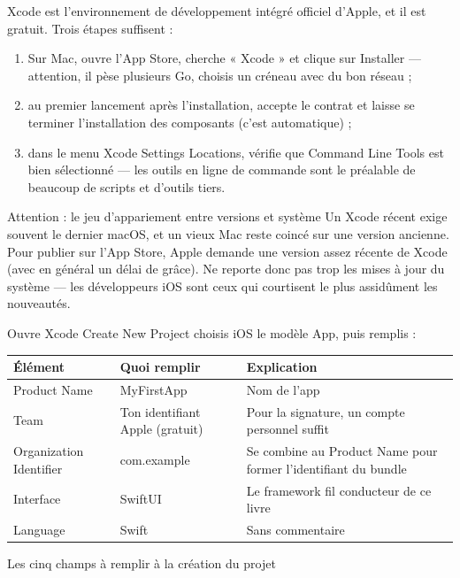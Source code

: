 Xcode est l’environnement de développement intégré officiel d’Apple, et il est gratuit. Trois étapes suffisent :

\begin{enumerate}
  \item Sur Mac, ouvre l’App Store, cherche « Xcode » et clique sur Installer — attention, il pèse plusieurs Go, choisis un créneau avec du bon réseau ;
  \item au premier lancement après l’installation, accepte le contrat et laisse se terminer l’installation des composants (c’est automatique) ;
  \item dans le menu Xcode Settings Locations, vérifie que Command Line Tools est bien sélectionné — les outils en ligne de commande sont le préalable de beaucoup de scripts et d’outils tiers.
\end{enumerate}

\begin{tcbwarn}{Attention : le jeu d’appariement entre versions et système}
Un Xcode récent exige souvent le dernier macOS, et un vieux Mac reste coincé sur une version ancienne. Pour publier sur l’App Store, Apple demande une version assez récente de Xcode (avec en général un délai de grâce). Ne reporte donc pas trop les mises à jour du système — les développeurs iOS sont ceux qui courtisent le plus assidûment les nouveautés.

\end{tcbwarn}


Ouvre Xcode Create New Project choisis iOS le modèle App, puis remplis :

\begin{center}
\begin{tabularx}{\linewidth}{|X|X|X|}
\hline
\textbf{Élément} & \textbf{Quoi remplir} & \textbf{Explication} \tabularnewline
\hline
Product Name & MyFirstApp & Nom de l’app \tabularnewline
Team & Ton identifiant Apple (gratuit) & Pour la signature, un compte personnel suffit \tabularnewline
Organization Identifier & com.example & Se combine au Product Name pour former l’identifiant du bundle \tabularnewline
Interface & SwiftUI & Le framework fil conducteur de ce livre \tabularnewline
Language & Swift & Sans commentaire \tabularnewline
\hline
\end{tabularx}
\end{center}

\begin{center}\small\color{gray}Les cinq champs à remplir à la création du projet\end{center}

